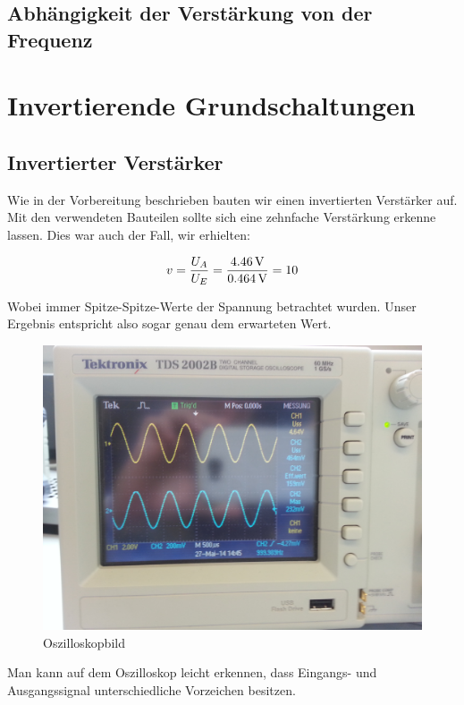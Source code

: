 \documentclass[a4paper,titlepage]{scrartcl}
\numberwithin{equation}{section}
\begin{document}
\subsection{Abhängigkeit der Verstärkung von der Frequenz}

\section{Invertierende Grundschaltungen}
\subsection{Invertierter Verstärker}

Wie in der Vorbereitung beschrieben bauten wir einen invertierten Verstärker auf. Mit den verwendeten Bauteilen sollte sich eine zehnfache Verstärkung erkenne lassen. Dies war auch der Fall, wir erhielten:

\begin{equation*}
v= \frac{U_A}{U_E}= \frac{\unit[4.46]{V}}{\unit[0.464]{V}}=10
\end{equation*}

Wobei immer Spitze-Spitze-Werte der Spannung betrachtet wurden. Unser Ergebnis entspricht also sogar genau dem erwarteten Wert.

\begin{figure}[H]
\centering
\includegraphics[scale=.08]{bilder/invert_verstaerker.jpg} 
\caption{Oszilloskopbild}
\end{figure}

Man kann auf dem Oszilloskop leicht erkennen, dass Eingangs- und Ausgangssignal unterschiedliche Vorzeichen besitzen.
\end{document}
